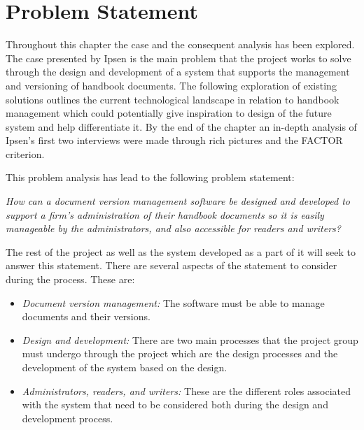\section{Problem Statement} \label{problemstatement}
Throughout this chapter the case and the consequent analysis has been explored.
The case presented by Ipsen is the main problem that the project works to solve through the design and development of a system that supports the management and versioning of handbook documents.
The following exploration of existing solutions outlines the current technological landscape in relation to handbook management which could potentially give inspiration to design of the future system and help differentiate it.
By the end of the chapter an in-depth analysis of Ipsen's first two interviews were made through rich pictures and the FACTOR criterion.

This problem analysis has lead to the following problem statement:

\begin{center}
\textit{How can a document version management software be designed and developed to support a firm's administration of their handbook documents so it is easily manageable by the administrators, and also accessible for readers and writers?}
\end{center}

The rest of the project as well as  the system developed as a part of it will seek to answer this statement.
There are several aspects of the statement to consider during the process.
These are:
\begin{itemize}
	\item
		\textit{Document version management:}
		The software must be able to manage documents and their versions.
	\item
		\textit{Design and development:}
		There are two main processes that the project group must undergo through the project which are the design processes and the development of the system based on the design.
	\item
		\textit{Administrators, readers, and writers:}
		These are the different roles associated with the system that need to be considered both during the design and development process.
\end{itemize}
